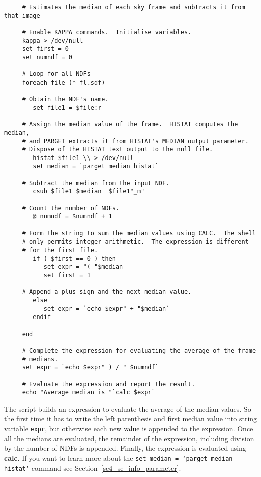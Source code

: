 \documentclass[twoside,11pt]{article}
\newcommand{\htmlref}[2]{#1}
\newcommand{\xref}[3]{#1}
\newcommand{\latexelsehtml}[2]{#1}
\newcommand{\latexelsehtml}[2]{#2}
\begin{document}
\small
\begin{verbatim}
     # Estimates the median of each sky frame and subtracts it from that image

     # Enable KAPPA commands.  Initialise variables.
     kappa > /dev/null
     set first = 0
     set numndf = 0

     # Loop for all NDFs
     foreach file (*_fl.sdf)

     # Obtain the NDF's name.
        set file1 = $file:r

     # Assign the median value of the frame.  HISTAT computes the median,
     # and PARGET extracts it from HISTAT's MEDIAN output parameter.
     # Dispose of the HISTAT text output to the null file.
        histat $file1 \\ > /dev/null
        set median = `parget median histat`

     # Subtract the median from the input NDF.
        csub $file1 $median  $file1"_m" 

     # Count the number of NDFs.
        @ numndf = $numndf + 1

     # Form the string to sum the median values using CALC.  The shell
     # only permits integer arithmetic.  The expression is different
     # for the first file. 
        if ( $first == 0 ) then
           set expr = "( "$median
           set first = 1

     # Append a plus sign and the next median value.
        else
           set expr = `echo $expr" + "$median`
        endif

     end

     # Complete the expression for evaluating the average of the frame
     # medians.
     set expr = `echo $expr" ) / " $numndf`

     # Evaluate the expression and report the result.
     echo "Average median is "`calc $expr`
\end{verbatim}
\normalsize
The script builds an expression to evaluate the average of the median
values.  So the first time it has to write the left parenthesis and
first median value into string variable {\tt expr}, but otherwise each
new value is appended to the expression.  Once all the medians are
evaluated, the remainder of the expression, including division by the
number of NDFs is appended.  Finally, the expression is evaluated using
\xref{{\bf calc}}{sun95}{CALC}.  If you want to learn more about the
\mbox{\tt set median = `parget median histat`} command
\latexelsehtml{see Section~\ref{sc4_se_info_parameter}.}{click \htmlref{here}{sc4_se_info_parameter}.}
\end{document}
